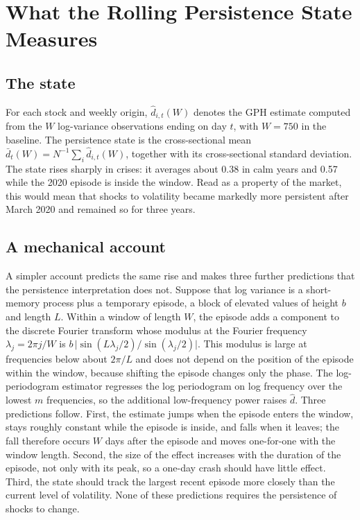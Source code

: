 \section{What the Rolling Persistence State Measures}\label{sec:window}

\subsection{The state}

For each stock and weekly origin, $\hat d_{i,t}(W)$ denotes the GPH estimate
computed from the $W$ log-variance observations ending on day $t$, with
$W=750$ in the baseline. The persistence state is the cross-sectional mean
$\bar d_t(W) = N^{-1}\sum_i \hat d_{i,t}(W)$, together with its
cross-sectional standard deviation. The state rises sharply in crises: it
averages about 0.38 in calm years and 0.57 while the 2020 episode is inside
the window. Read as a property of the market, this would mean that shocks to
volatility became markedly more persistent after March 2020 and remained so
for three years.

\subsection{A mechanical account}

A simpler account predicts the same rise and makes three further predictions
that the persistence interpretation does not. Suppose that log variance is a
short-memory process plus a temporary episode, a block of elevated values of
height $b$ and length $L$. Within a window of length $W$, the episode adds a
component to the discrete Fourier transform whose modulus at the Fourier
frequency $\lambda_j = 2\pi j/W$ is
$b\,\lvert\sin(L\lambda_j/2)/\sin(\lambda_j/2)\rvert$. This modulus is large
at frequencies below about $2\pi/L$ and does not depend on the position of
the episode within the window, because shifting the episode changes only the
phase. The log-periodogram estimator regresses the log periodogram on log
frequency over the lowest $m$ frequencies, so the additional low-frequency
power raises $\hat d$. Three predictions follow. First, the estimate jumps
when the episode enters the window, stays roughly constant while the episode
is inside, and falls when it leaves; the fall therefore occurs $W$ days after
the episode and moves one-for-one with the window length. Second, the size
of the effect increases with the duration of the episode, not only with its
peak, so a one-day crash should have little effect. Third, the state should
track the largest recent episode more closely than the current level of
volatility. None of these predictions requires the persistence of shocks to
change.

